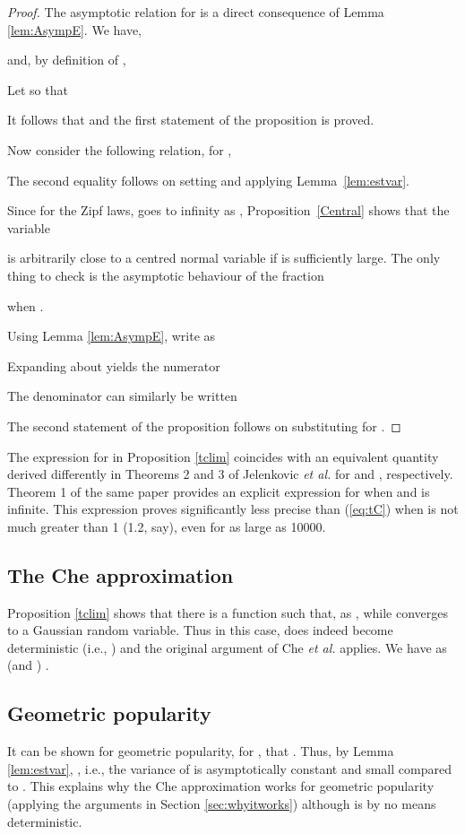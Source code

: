 \documentclass{amsart}
\def\etal{{\em et al. }}
\begin{document}
\begin{proof}
The asymptotic relation for  is a direct consequence of  Lemma \ref{lem:AsympE}. We have,
 
and, by definition of ,


Let  so that 

It follows that  and the first statement of the proposition is proved.

Now consider the following relation, for ,

The second equality follows on setting  and applying Lemma~\ref{lem:estvar}. 

Since for the Zipf laws,  goes to infinity as , Proposition~\ref{Central} shows that the variable

is arbitrarily close to a centred normal variable if  is sufficiently large. The only thing to check is the asymptotic behaviour of the fraction

when . 

Using Lemma \ref{lem:AsympE}, write  as

Expanding  about  yields the numerator 

The denominator can similarly be written

The second statement of the proposition follows on substituting for . 

\end{proof}

\vspace{2mm}
 The expression for  in Proposition \ref{tclim} coincides with an equivalent quantity derived differently in Theorems 2 and 3 of Jelenkovic \etal   \cite{JKR05} for  and , respectively. Theorem 1 of the same paper provides an explicit expression for  when  and  is infinite. This expression proves significantly less precise than (\ref{eq:tC}) when  is not much greater than 1 (1.2, say), even for  as large as 10000.

\subsection{The Che approximation}
Proposition \ref{tclim} shows that there is a function  such that, as ,  while  converges to a Gaussian random variable. Thus in this case,  does indeed become deterministic (i.e., ) and the original argument of Che \etal applies. We have  as  (and ) . 

\subsection{Geometric popularity}
It can be shown for geometric popularity,  for , that . Thus, by Lemma \ref{lem:estvar}, , i.e., the variance of  is asymptotically constant and small compared to . This explains why the Che approximation works for geometric popularity (applying the arguments in Section \ref{sec:whyitworks}) although  is by no means deterministic. 
\end{document}
